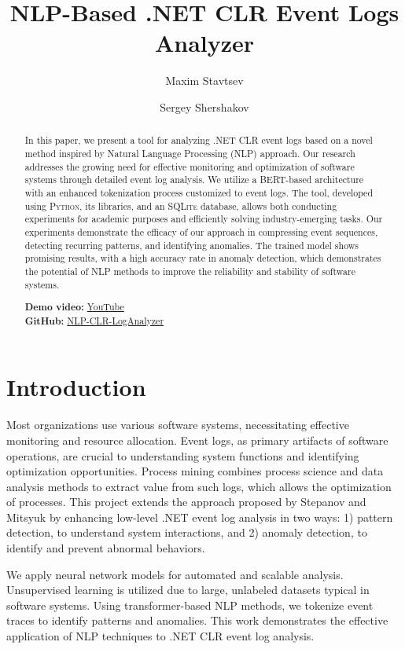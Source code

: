 \documentclass[sigplan,nonacm]{acmart}
\title{NLP-Based .NET CLR Event Logs Analyzer}
\author{Maxim Stavtsev}
\affiliation{\institution{HSE University}\city{Moscow}\country{Russia}}
\author{Sergey Shershakov}
\affiliation{\institution{HSE University}\city{Moscow}\country{Russia}}
\begin{document}
\begin{abstract}
In this paper, we present a tool for analyzing .NET CLR event logs based on a novel method inspired by Natural Language Processing (NLP) approach. Our research addresses the growing need for effective monitoring and optimization of software systems through detailed event log analysis. We utilize a BERT-based architecture with an enhanced tokenization process customized to event logs. The tool, developed using \textsc{Python}, its libraries, and an \textsc{SQLite} database, allows both conducting experiments for academic purposes and efficiently solving industry-emerging tasks. Our experiments demonstrate the efficacy of our approach in compressing event sequences, detecting recurring patterns, and identifying anomalies. The trained model shows promising results, with a high accuracy rate in anomaly detection, which demonstrates the potential of NLP methods to improve the reliability and stability of software systems.

\noindent
\textbf{Demo video:} \href{https://youtu.be/JLCS4F-AlYc}{YouTube} \\
\textbf{GitHub:} \href{https://github.com/mastavtsev/NLP-CLR-LogAnalyzer}{NLP-CLR-LogAnalyzer}

\end{abstract}

\maketitle

\section{Introduction}
Most organizations use various software systems, necessitating effective monitoring and resource allocation. Event logs, as primary artifacts of software operations, are crucial to understanding system functions and identifying optimization opportunities. Process mining combines process science and data analysis methods to extract value from such logs, which allows the optimization of processes. This project extends the approach proposed by Stepanov and Mitsyuk \cite{stepanov2024extracting} by enhancing low-level .NET event log analysis in two ways: 1) pattern detection, to understand system interactions, and 2) anomaly detection, to identify and prevent abnormal behaviors.

We apply neural network models for automated and scalable analysis. Unsupervised learning is utilized due to large, unlabeled datasets typical in software systems. Using transformer-based NLP methods, we tokenize event traces to identify patterns and anomalies. This work demonstrates the effective application of NLP techniques to .NET CLR event log analysis.
\end{document}
